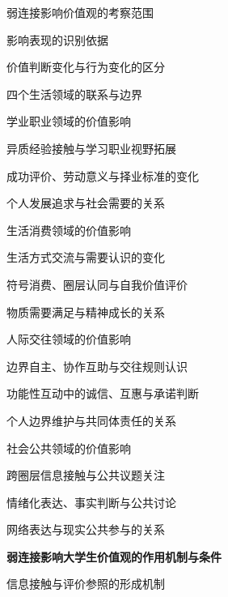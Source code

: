 \begin{thesisframework}
\begin{thesisoutline}
  \begin{thesisoutline}
    \item 弱连接影响价值观的考察范围
    \begin{thesisoutline}
      \item 影响表现的识别依据
      \item 价值判断变化与行为变化的区分
      \item 四个生活领域的联系与边界
    \end{thesisoutline}
    \item 学业职业领域的价值影响
    \begin{thesisoutline}
      \item 异质经验接触与学习职业视野拓展
      \item 成功评价、劳动意义与择业标准的变化
      \item 个人发展追求与社会需要的关系
    \end{thesisoutline}
    \item 生活消费领域的价值影响
    \begin{thesisoutline}
      \item 生活方式交流与需要认识的变化
      \item 符号消费、圈层认同与自我价值评价
      \item 物质需要满足与精神成长的关系
    \end{thesisoutline}
    \item 人际交往领域的价值影响
    \begin{thesisoutline}
      \item 边界自主、协作互助与交往规则认识
      \item 功能性互动中的诚信、互惠与承诺判断
      \item 个人边界维护与共同体责任的关系
    \end{thesisoutline}
    \item 社会公共领域的价值影响
    \begin{thesisoutline}
      \item 跨圈层信息接触与公共议题关注
      \item 情绪化表达、事实判断与公共讨论
      \item 网络表达与现实公共参与的关系
    \end{thesisoutline}
  \end{thesisoutline}
  \item \textbf{弱连接影响大学生价值观的作用机制与条件}
  \begin{thesisoutline}
    \item 信息接触与评价参照的形成机制

\end{thesisoutline}
\end{thesisoutline}
\end{thesisframework}
